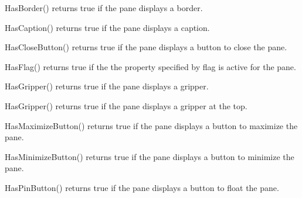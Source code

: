 HasBorder() returns true if the pane displays a border.

\label{wxauipaneinfohascaption}


HasCaption() returns true if the pane displays a caption.

\label{wxauipaneinfohasclosebutton}


HasCloseButton() returns true if the pane displays a button to close the pane.

\label{wxauipaneinfohasflag}


HasFlag() returns true if the the property specified by flag is active for the pane.

\label{wxauipaneinfohasgripper}


HasGripper() returns true if the pane displays a gripper.

\label{wxauipaneinfohasgrippertop}


HasGripper() returns true if the pane displays a gripper at the top.

\label{wxauipaneinfohasmaximizebutton}


HasMaximizeButton() returns true if the pane displays a button to maximize the pane.

\label{wxauipaneinfohasminimizebutton}


HasMinimizeButton() returns true if the pane displays a button to minimize the pane.

\label{wxauipaneinfohaspinbutton}


HasPinButton() returns true if the pane displays a button to float the pane.

